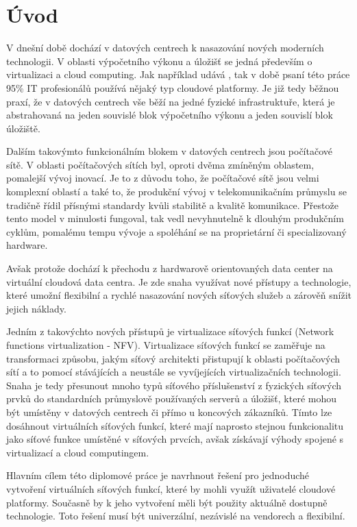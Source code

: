 
\chapter{Úvod}

V dnešní době dochází v datových centrech k nasazování nových moderních technologii. V oblasti výpočetního výkonu a úložišť se jedná především o virtualizaci a cloud computing. Jak například udává \cite{Cloud_adoption} , tak v době psaní této práce 95\% IT profesionálů používá nějaký typ cloudové platformy. Je již tedy běžnou praxí, že v datových centrech vše běží na jedné fyzické infrastruktuře, která je abstrahovaná na jeden souvislé blok výpočetního výkonu a jeden souvislí blok úložiště.

Dalším takovýmto funkcionálním blokem v datových centrech jsou počítačové sítě. V oblasti počítačových sítích byl, oproti dvěma zmíněným oblastem, pomalejší vývoj inovací. Je to z důvodu toho, že počítačové sítě jsou velmi komplexní oblastí a také to, že produkční vývoj v telekomunikačním průmyslu se tradičně řídil přísnými standardy kvůli stabilitě a kvalitě komunikace. Přestože tento model v minulosti fungoval, tak vedl nevyhnutelně k dlouhým produkčním cyklům, pomalému tempu vývoje a spoléhání se na proprietární či specializovaný hardware.

Avšak protože dochází k přechodu z hardwarově orientovaných data center na virtuální cloudová data centra. Je zde snaha využívat nové přístupy a technologie, které umožní flexibilní a rychlé nasazování nových síťových služeb a zárověň snížit jejich náklady.

Jedním z takovýchto nových přístupů je virtualizace síťových funkcí (Network functions virtualization - NFV). Virtualizace síťových funkcí se zaměřuje na transformaci způsobu, jakým síťový architekti přistupují k oblasti počítačových sítí a to pomocí stávájících a neustále se vyvíjejících virtualizačních technologii. Snaha je tedy přesunout mnoho typů síťového příslušenství z fyzických síťových prvků do standardních průmyslově používaných serverů a úložišť, které mohou být umístěny v datových centrech či přímo u koncových zákazníků. Tímto lze dosáhnout virtuálních síťových funkcí, které mají naprosto stejnou funkcionalitu jako síťové funkce umístěné v síťových prvcích, avšak získávají výhody spojené s virtualizací a cloud computingem.

Hlavním cílem této diplomové práce je navrhnout řešení pro jednoduché vytvoření virtuálních síťových funkcí, které by mohli využít uživatelé cloudové platformy. Současně by k jeho vytvoření měli být použity aktuálně dostupně technologie. Toto řešení musí být univerzální, nezávislé na vendorech a flexibilní.

